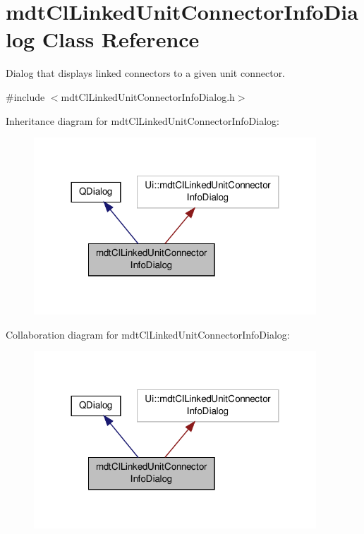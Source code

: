 \hypertarget{classmdt_cl_linked_unit_connector_info_dialog}{\section{mdt\-Cl\-Linked\-Unit\-Connector\-Info\-Dialog Class Reference}
\label{classmdt_cl_linked_unit_connector_info_dialog}
}


Dialog that displays linked connectors to a given unit connector.  




{\ttfamily \#include $<$mdt\-Cl\-Linked\-Unit\-Connector\-Info\-Dialog.\-h$>$}



Inheritance diagram for mdt\-Cl\-Linked\-Unit\-Connector\-Info\-Dialog\-:
\nopagebreak
\begin{figure}[H]
\begin{center}
\leavevmode
\includegraphics[width=300pt]{classmdt_cl_linked_unit_connector_info_dialog__inherit__graph}
\end{center}
\end{figure}


Collaboration diagram for mdt\-Cl\-Linked\-Unit\-Connector\-Info\-Dialog\-:
\nopagebreak
\begin{figure}[H]
\begin{center}
\leavevmode
\includegraphics[width=300pt]{classmdt_cl_linked_unit_connector_info_dialog__coll__graph}
\end{center}
\end{figure}
